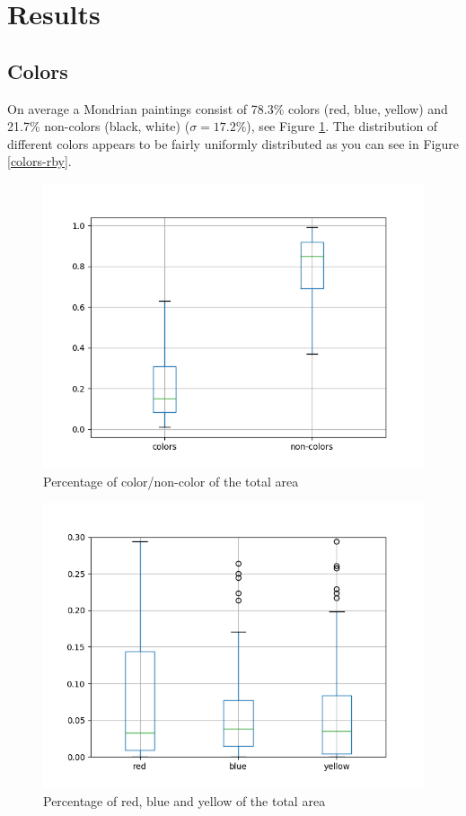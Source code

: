 \section{Results}


\subsection{Colors}

On average a Mondrian paintings consist of 78.3\% colors (red, blue, yellow) and
21.7\% non-colors (black, white) ($\sigma = 17.2\%$), see Figure
\ref{fig:colors-noncolors}. The distribution of different colors appears to be
fairly uniformly distributed as you can see in Figure \ref{colors-rby}.

\begin{figure}
  \includegraphics[width=\linewidth]{images/colors-non-colors.png}
  \caption{Percentage of color/non-color of the total area}
  \label{fig:colors-noncolors}
\end{figure}

\begin{figure}
  \includegraphics[width=\linewidth]{images/colors-rby.png}
  \caption{Percentage of red, blue and yellow of the total area}
  \label{fig:colors-rby}
\end{figure}

